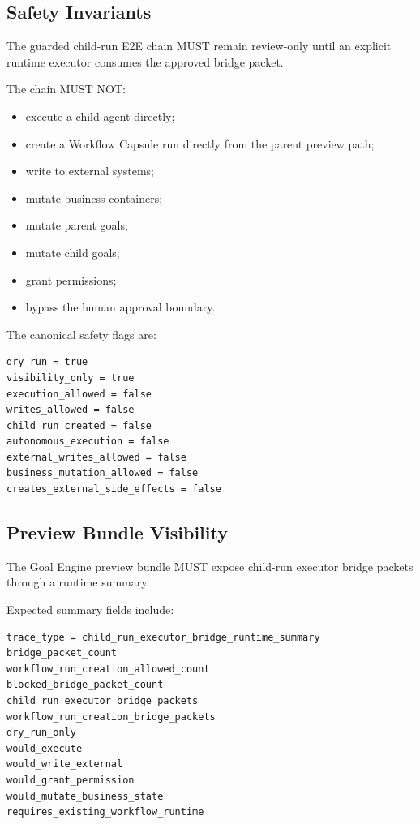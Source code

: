 \subsection{Safety Invariants}

The guarded child-run E2E chain MUST remain review-only until an explicit runtime executor consumes the approved bridge packet.

The chain MUST NOT:

\begin{itemize}
  \item execute a child agent directly;
  \item create a Workflow Capsule run directly from the parent preview path;
  \item write to external systems;
  \item mutate business containers;
  \item mutate parent goals;
  \item mutate child goals;
  \item grant permissions;
  \item bypass the human approval boundary.
\end{itemize}

The canonical safety flags are:

\begin{verbatim}
dry_run = true
visibility_only = true
execution_allowed = false
writes_allowed = false
child_run_created = false
autonomous_execution = false
external_writes_allowed = false
business_mutation_allowed = false
creates_external_side_effects = false
\end{verbatim}

\subsection{Preview Bundle Visibility}

The Goal Engine preview bundle MUST expose child-run executor bridge packets through a runtime summary.

Expected summary fields include:

\begin{verbatim}
trace_type = child_run_executor_bridge_runtime_summary
bridge_packet_count
workflow_run_creation_allowed_count
blocked_bridge_packet_count
child_run_executor_bridge_packets
workflow_run_creation_bridge_packets
dry_run_only
would_execute
would_write_external
would_grant_permission
would_mutate_business_state
requires_existing_workflow_runtime
\end{verbatim}

